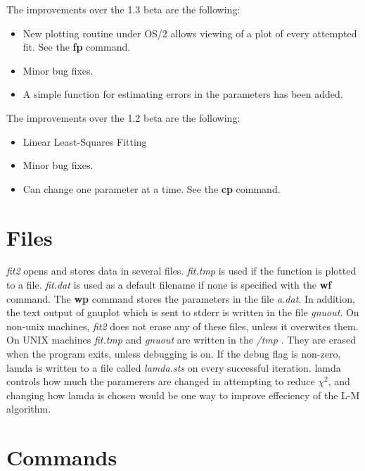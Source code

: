  The improvements over the 1.3 beta are the following:

\begin{itemize}
\item New plotting routine under OS/2 allows viewing
 of a plot of every attempted fit.  See the {\bf fp} command.
\item Minor bug fixes.
\item A simple function for estimating errors in the parameters
has been added.
\end{itemize}
 The improvements over the 1.2 beta are the following:
\begin{itemize}
\item Linear Least-Squares Fitting
\item Minor bug fixes.
\item Can change one parameter at a time.  See the {\bf cp} command.
\end{itemize}

\section{Files}

        {\em fit2} opens and stores data in several files.
 {\em fit.tmp} is used if the function is plotted to a file.
 {\em fit.dat} is used as a default filename if none is specified
 with the {\bf wf} command. The {\bf wp} command stores the parameters
 in the file {\em a.dat}. In addition, the text output of gnuplot
 which is sent to stderr is written in the file {\em gnuout}.
 On non-unix machines, {\em fit2} does not erase any of these
 files, unless it overwites them.  On UNIX machines {\em fit.tmp}
 and {\em gnuout} are written in the {\em /tmp }.  They are
 erased when the program exits, unless debugging is on.
 If the debug flag is non-zero, lamda is written to a file
 called {\em lamda.sts} on every successful iteration.  lamda
 controls how much the paramerers are changed in attempting
 to reduce $\chi^2$, and changing how lamda is chosen would be
 one way to improve effeciency of the L-M algorithm.

\section{Commands}

